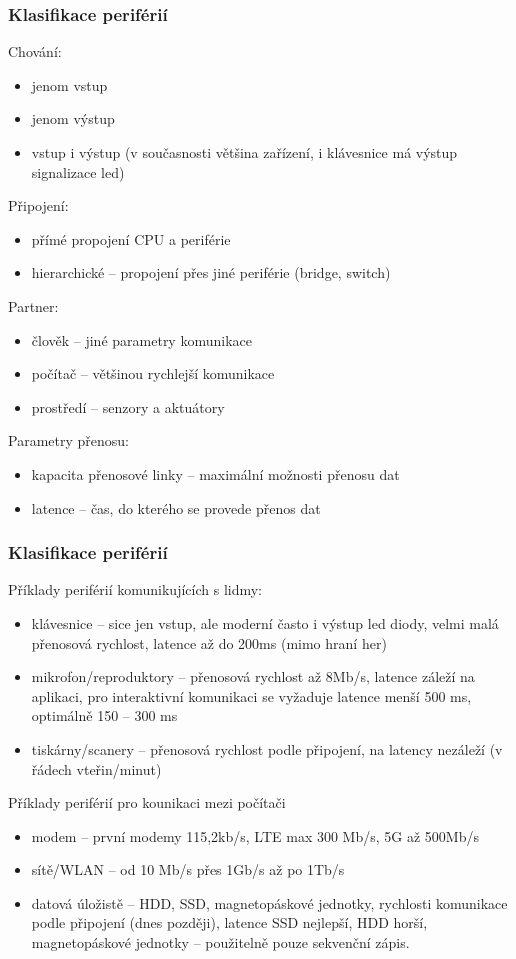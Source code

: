 \documentclass{beamer}
\begin{document}
\begin{frame}
\frametitle{Klasifikace periférií}
Chování:
\begin{itemize}
\item jenom vstup
\item jenom výstup
\item vstup i výstup (v současnosti většina zařízení, i klávesnice má výstup signalizace led)
\end{itemize}

Připojení:
\begin{itemize}
\item přímé propojení CPU a periférie
\item hierarchické -- propojení přes jiné periférie (bridge, switch)
\end{itemize}

Partner:
\begin{itemize}
\item člověk -- jiné parametry komunikace
\item počítač -- většinou rychlejší komunikace
\item prostředí -- senzory a aktuátory
\end{itemize}

Parametry přenosu:
\begin{itemize}
\item kapacita přenosové linky -- maximální možnosti přenosu dat
\item latence -- čas, do kterého se provede přenos dat
\end{itemize}
\end{frame}

\begin{frame}
\frametitle{Klasifikace periférií}

Příklady periférií komunikujících s lidmy:
\begin{itemize}
\item klávesnice -- sice jen vstup, ale moderní často i výstup led diody, velmi malá přenosová rychlost, latence až do 200ms (mimo hraní her) 
\item mikrofon/reproduktory -- přenosová rychlost až 8Mb/s, latence záleží na aplikaci, pro interaktivní komunikaci se vyžaduje latence menší 500 ms, optimálně 150 -- 300 ms 
\item tiskárny/scanery -- přenosová rychlost podle připojení, na latency nezáleží (v řádech vteřin/minut)
\end{itemize}

Příklady periférií pro kounikaci mezi počítači
\begin{itemize}
\item modem -- první modemy 115,2kb/s, LTE max 300 Mb/s, 5G až 500Mb/s
\item sítě/WLAN -- od 10 Mb/s přes 1Gb/s až po 1Tb/s
\item datová úložistě -- HDD, SSD, magnetopáskové jednotky, rychlosti komunikace podle připojení (dnes později), latence SSD nejlepší, HDD horší, magnetopáskové jednotky -- použitelně pouze sekvenční zápis.
\end{itemize}

\end{frame}
\end{document}
